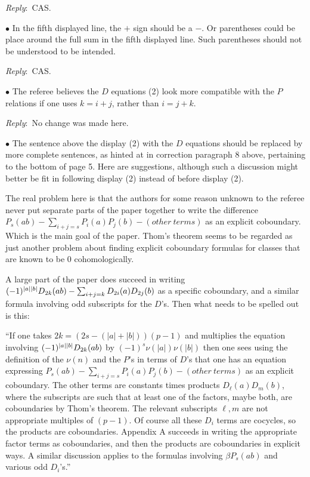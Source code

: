 \documentclass{amsart}
\newcommand{\ar}{\medskip\noindent\textit{Reply}:\ }
\def\subitem{\medskip\noindent$\bullet$ }
\begin{document}
\begin{enumerate}
	\ar CAS.

	\subitem In the fifth displayed line, the $+$ sign should be a $-$.
	Or parentheses could be place around the full sum in the fifth displayed line.
	Such parentheses should not be understood to be	intended.

	\ar CAS.

	\subitem The referee believes the $D$ equations (2) look more compatible with the $P$ relations if one uses $k = i+j$, rather than $i = j+k$.

	\ar No change was made here.

	\subitem The sentence above the display (2) with the $D$ equations should be replaced by more complete sentences, as hinted at in correction paragraph 8 above, pertaining to the bottom of page 5.
	Here are suggestions, although such a discussion might better be fit in following display (2) instead of before display (2).

	\medskip\noindent The real problem here is that the authors for some reason unknown to the referee never put separate parts of the paper together to write the difference $P_s(ab) - \sum_{i+j=s} P_i(a)P_j(b) - (other\ terms)$ as an explicit coboundary.
	Which is the main goal of the paper.
	Thom’s theorem seems to	be regarded as just another problem about finding explicit coboundary formulas for classes that are known to be 0 cohomologically.

	\medskip\noindent A large part of the paper does succeed in writing $(-1)^{\lvert a\rvert\lvert b\rvert} D_{2k}(ab) - \sum_{i+j=k} D_{2i}(a) D_{2j}(b)$
	as a specific coboundary, and a similar formula involving odd subscripts for the $D$’s.
	Then what needs to be spelled out is this:

	\medskip\noindent ``If one takes $2k = (2s-(|a|+|b|))(p-1)$ and multiplies the equation involving $(-1)^{\lvert a\rvert\lvert b\rvert} D_{2k}(ab)$ by $(-1)^s \nu(|a|)\nu(|b|)$ then one sees using the definition of the $\nu(n)$ and the $P$’s in terms of $D$’s that one has an equation expressing $P_s(ab) - \sum_{i+j=s} P_i(a)P_j(b) - (other\ terms)$ as an explicit coboundary.
	The other terms are constants times products $D_\ell(a) D_m(b)$, where the subscripts are such that at least one of the factors, maybe both, are coboundaries by Thom’s theorem.
	The relevant subscripts $\ell, m$ are not appropriate multiples of $(p-1)$.
	Of course all these $D_i$ terms are cocycles, so the products are coboundaries.
	Appendix A succeeds in writing the appropriate factor terms as coboundaries, and then the products are coboundaries in explicit ways.
	A similar discussion applies to the formulas involving $\beta P_s(ab)$ and various odd $D_i$’s.”


\end{enumerate}
\end{document}
